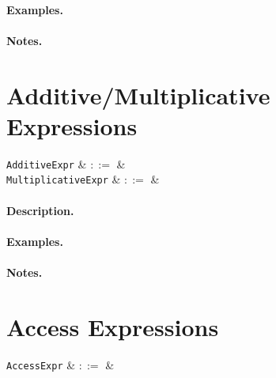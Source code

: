 \paragraph{Examples.}

\paragraph{Notes.} 


\section{Additive/Multiplicative Expressions}
\label{c_expr_addmul}

\begin{syntax}
  \verb+AdditiveExpr+ & $::=$ &\\
  \verb+MultiplicativeExpr+ & $::=$ &\\
\end{syntax}

\paragraph{Description.}

\paragraph{Examples.}

\paragraph{Notes.} 


\section{Access Expressions}
\label{c_expr_access}

\begin{syntax}
  \verb+AccessExpr+ & $::=$ &\\
\end{syntax}

